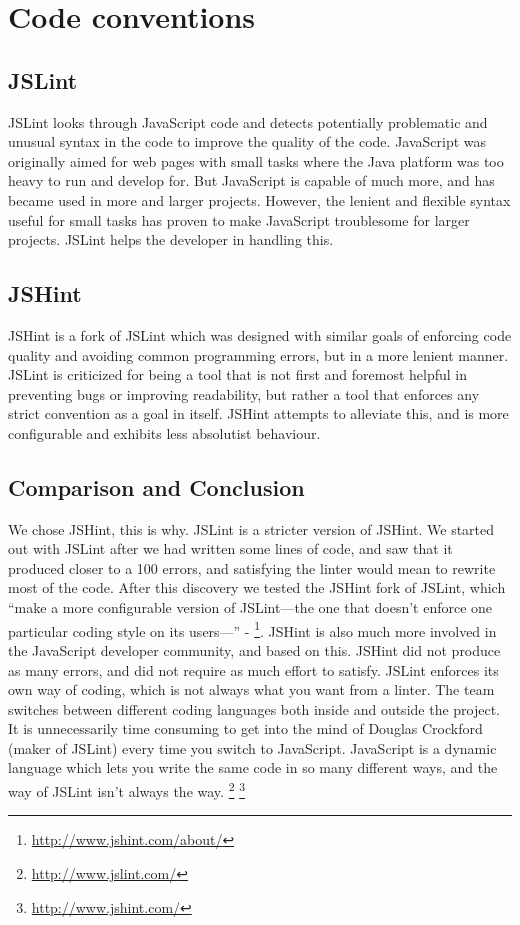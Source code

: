 \section{Code conventions}
\subsection*{JSLint}
JSLint looks through JavaScript code and detects potentially problematic and unusual syntax in the code to improve the quality of the code. JavaScript was originally aimed for web pages with small tasks where the Java platform was too heavy to run and develop for. But JavaScript is capable of much more, and has became used in more and larger projects. However, the lenient and flexible syntax useful for small tasks has proven to make JavaScript troublesome for larger projects. JSLint helps the developer in handling this. \cite{jslint-about}

\subsection*{JSHint}
JSHint is a fork of JSLint which was designed with similar goals of enforcing code quality and avoiding common programming errors, but in a more lenient manner. JSLint is criticized for being a tool that is not first and foremost helpful in preventing bugs or improving readability, but rather a tool that enforces any strict convention as a goal in itself. JSHint attempts to alleviate this, and is more configurable and exhibits less absolutist behaviour. \cite{jshint-about}

\subsection*{Comparison and Conclusion}
We chose JSHint, this is why.
JSLint is a stricter version of JSHint. We started out with JSLint after we had written some lines of code, and saw that it produced closer to a 100 errors, and satisfying the linter would mean to rewrite most of the code. After this discovery we tested the JSHint fork of JSLint, which  “make a more configurable version of JSLint—the one that doesn't enforce one particular coding style on its users—” - \footnote{\url{http://www.jshint.com/about/}}. JSHint is also much more involved in the JavaScript developer community, and based on this. JSHint did not produce as many errors, and did not require as much effort to satisfy. JSLint enforces its own way of coding, which is not always what you want from a linter. The team switches between different coding languages both inside and outside the project. It is unnecessarily time consuming to get into the mind of Douglas Crockford (maker of JSLint) every time you switch to JavaScript. JavaScript is a dynamic language which lets you write the same code in so many different ways, and the way of JSLint isn’t always the way.
\footnote{\url{http://www.jslint.com/}}
\footnote{\url{http://www.jshint.com/}}


